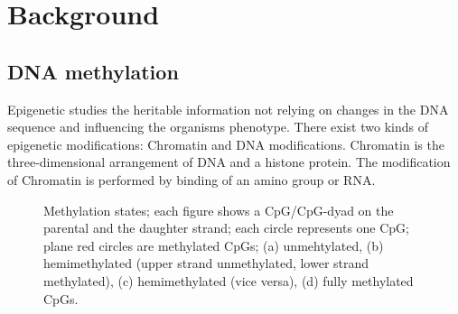 \pagestyle{headings}
\chapter{Background}
\label{chapter:background}
\section{DNA methylation} 
\label{section:DNAMeth} 
Epigenetic studies the heritable information not relying on changes in the DNA sequence and influencing the organisms phenotype. There exist two kinds of epigenetic modifications: Chromatin and DNA modifications. Chromatin is the three-dimensional arrangement of DNA and a histone protein. The modification of Chromatin is performed by binding of an amino group or RNA\cite{Epigenetics}.\\

\begin{figure}[h]
\begin{subfigure}{.24\textwidth}
\centering
{}
\caption{}
\label{fig:sfig0}
\end{subfigure}%
\begin{subfigure}{.24\textwidth}
\centering
{}
  \caption{}
  \label{fig:sfig1}
\end{subfigure}
\begin{subfigure}{.24\textwidth}
\centering
{}
  \caption{}
  \label{fig:sfig2}
\end{subfigure}
\begin{subfigure}{.24\textwidth}
\centering
{}
  \caption{}
  \label{fig:sfig3}
\end{subfigure}
\caption{Methylation states; each figure shows a CpG/CpG-dyad on the parental and the daughter strand; each circle represents one CpG; plane red circles are methylated CpGs; (a) unmehtylated, (b) hemimethylated (upper strand unmethylated, lower strand methylated), (c) hemimethylated (vice versa), (d) fully methylated CpGs.}
\label{fig:methylationpatterns}
\end{figure}

